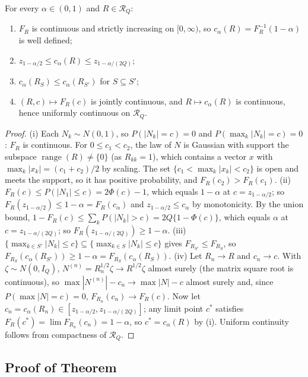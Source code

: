 \begin{lemma}\label{lem:crit}
For every $\alpha\in(0,1)$ and $R\in\mathcal R_Q$:
\begin{enumerate}
\item[(i)] $F_R$ is continuous and strictly increasing on $[0,\infty)$, so $c_\alpha(R)=F_R^{-1}(1-\alpha)$ is well defined;
\item[(ii)] $z_{1-\alpha/2}\le c_\alpha(R)\le z_{1-\alpha/(2Q)}$;
\item[(iii)] $c_\alpha(R_S)\le c_\alpha(R_{S'})$ for $S\subseteq S'$;
\item[(iv)] $(R,c)\mapsto F_R(c)$ is jointly continuous, and $R\mapsto c_\alpha(R)$ is continuous, hence uniformly continuous on $\mathcal R_Q$.
\end{enumerate}
\end{lemma}
\begin{proof}
(i) Each $N_k\sim N(0,1)$, so $P(|N_k|=c)=0$ and $P(\max_k|N_k|=c)=0$: $F_R$ is continuous. For $0\le c_1<c_2$, the law of $N$ is Gaussian with support the subspace $\operatorname{range}(R)\neq\{0\}$ (as $R_{kk}=1$), which contains a vector $x$ with $\max_k|x_k|=(c_1+c_2)/2$ by scaling. The set $\{c_1<\max_k|x_k|<c_2\}$ is open and meets the support, so it has positive probability, and $F_R(c_2)>F_R(c_1)$.
(ii) $F_R(c)\le P(|N_1|\le c)=2\Phi(c)-1$, which equals $1-\alpha$ at $c=z_{1-\alpha/2}$; so $F_R(z_{1-\alpha/2})\le1-\alpha=F_R(c_\alpha)$ and $z_{1-\alpha/2}\le c_\alpha$ by monotonicity. By the union bound, $1-F_R(c)\le\sum_kP(|N_k|>c)=2Q\{1-\Phi(c)\}$, which equals $\alpha$ at $c=z_{1-\alpha/(2Q)}$; so $F_R(z_{1-\alpha/(2Q)})\ge1-\alpha$.
(iii) $\{\max_{k\in S'}|N_k|\le c\}\subseteq\{\max_{k\in S}|N_k|\le c\}$ gives $F_{R_{S'}}\le F_{R_S}$, so $F_{R_S}(c_\alpha(R_{S'}))\ge1-\alpha=F_{R_S}(c_\alpha(R_S))$.
(iv) Let $R_n\to R$ and $c_n\to c$. With $\zeta\sim N(0,I_Q)$, $N^{(n)}=R_n^{1/2}\zeta\to R^{1/2}\zeta$ almost surely (the matrix square root is continuous), so $\max|N^{(n)}|-c_n\to\max|N|-c$ almost surely and, since $P(\max|N|=c)=0$, $F_{R_n}(c_n)\to F_R(c)$. Now let $c_n=c_\alpha(R_n)\in[z_{1-\alpha/2},z_{1-\alpha/(2Q)}]$; any limit point $c^\ast$ satisfies $F_R(c^\ast)=\lim F_{R_n}(c_n)=1-\alpha$, so $c^\ast=c_\alpha(R)$ by (i). Uniform continuity follows from compactness of $\mathcal R_Q$.
\end{proof}

\subsection{Proof of Theorem~}\label{si:testing-fwer}

